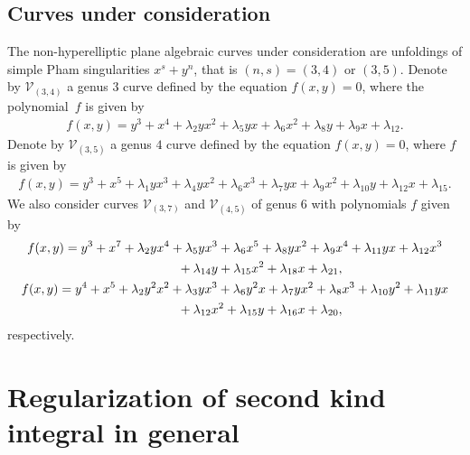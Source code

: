\documentclass[11pt]{article}
\numberwithin{equation}{section}
\begin{document}
\subsection{Curves under consideration}
The non-hyperelliptic plane algebraic curves under consideration are unfoldings of simple Pham singularities $x^s + y^n$, that is $(n,s)=(3,4)$ or $(3,5)$. Denote by $\mathcal{V}_{(3,4)}$ a genus $3$ curve defined by the equation $f(x,y)=0$, where the polynomial~$f$ is given by
\begin{gather}\label{C34eq}
f(x,y) = y^3 + x^4 + \lambda_2 y x^2 + \lambda_5 y x + \lambda_6 x^2 + \lambda_8 y + \lambda_9 x + \lambda_{12}.
\end{gather}
Denote by $\mathcal{V}_{(3,5)}$ a genus $4$ curve defined by the equation $f(x,y)=0$, where
$f$ is given by
\begin{gather}\label{C35eq}
 f(x,y) = y^3 + x^5 + \lambda_1 y x^3 + \lambda_4 y x^2 + \lambda_6 x^3 + \lambda_7 y x + \lambda_9 x^2 + \lambda_{10} y + \lambda_{12} x + \lambda_{15}.
\end{gather}
We also consider curves $\mathcal{V}_{(3,7)}$ and $\mathcal{V}_{(4,5)}$ of genus 6 with polynomials $f$ given by
\begin{gather*}
f(x,y) = y^3 + x^7 + \lambda_2 y x^4 + \lambda_5 y x^3 + \lambda_6 x^5 + \lambda_8 y x^2 + \lambda_9 x^4 + \lambda_{11} y x + \lambda_{12} x^3 \\
\hphantom{f(x,y) =}{} + \lambda_{14} y + \lambda_{15} x^2 + \lambda_{18} x + \lambda_{21},\\
f(x,y) = y^4 + x^5 + \lambda_2 y^2 x^2 + \lambda_3 y x^3 +\lambda_6 y^2 x+\lambda_7 y x^2 + \lambda_8 x^3 +\lambda_{10} y^2 +\lambda_{11} y x \\
\hphantom{f(x,y) =}{} + \lambda_{12} x^2 + \lambda_{15} y + \lambda_{16} x + \lambda_{20},
\end{gather*}
respectively.

\section{Regularization of second kind integral in general}\label{s:RegInt}
\end{document}
